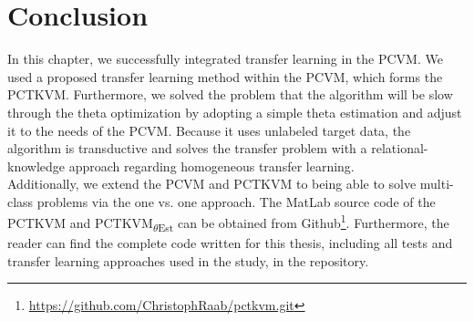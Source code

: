 \section{Conclusion}\label{InSecCon}
In this chapter, we successfully integrated transfer learning in the \acs{PCVM}.
We used a proposed transfer learning method within the \acs{PCVM}, which forms the \acs{PCTKVM}.
Furthermore, we solved the problem that the algorithm will be slow through the theta optimization by adopting a simple theta estimation and adjust it to the needs of the \acs{PCVM}.
Because it uses unlabeled target data, the algorithm is transductive and solves the transfer problem with a relational-knowledge approach regarding homogeneous transfer learning.\\
Additionally, we extend the \acs{PCVM} and \acs{PCTKVM} to being able to solve multi-class problems via the one vs. one approach.
The MatLab source code of the \acs{PCTKVM} and \acs{PCTKVM}\textsubscript{$\theta$Est} can be obtained from Github\footnote{\url{https://github.com/ChristophRaab/pctkvm.git}}.
Furthermore, the reader can find the complete code written for this thesis, including all tests and transfer learning approaches used in the study, in the repository.
